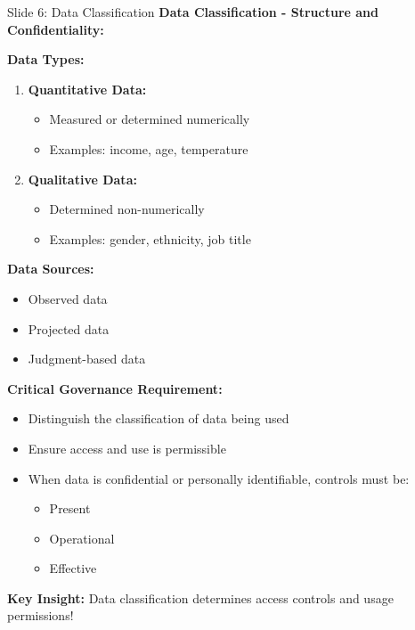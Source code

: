 \documentclass[8pt]{beamer}
\begin{document}
	
	\begin{frame}{Slide 6: Data Classification}
		\fontsize{6.5}{7.5}\selectfont
		\textbf{Data Classification - Structure and Confidentiality:}
		
		\vspace{0.1cm}
		\textbf{Data Types:}
		\begin{enumerate}
			\item \textbf{Quantitative Data:}
			\begin{itemize}
				\item Measured or determined numerically
				\item Examples: income, age, temperature
			\end{itemize}
			\item \textbf{Qualitative Data:}
			\begin{itemize}
				\item Determined non-numerically
				\item Examples: gender, ethnicity, job title
			\end{itemize}
		\end{enumerate}
		
		\vspace{0.1cm}
		\textbf{Data Sources:}
		\begin{itemize}
			\item Observed data
			\item Projected data
			\item Judgment-based data
		\end{itemize}
		
		\vspace{0.1cm}
		\textbf{Critical Governance Requirement:}
		\begin{itemize}
			\item Distinguish the classification of data being used
			\item Ensure access and use is permissible
			\item When data is confidential or personally identifiable, controls must be:
			\begin{itemize}
				\item Present
				\item Operational
				\item Effective
			\end{itemize}
		\end{itemize}
		
		\textcolor{myblue}{\textbf{Key Insight:}} Data classification determines \textcolor{myblue}{access controls and usage permissions}!
	\end{frame}
	
\end{document}
